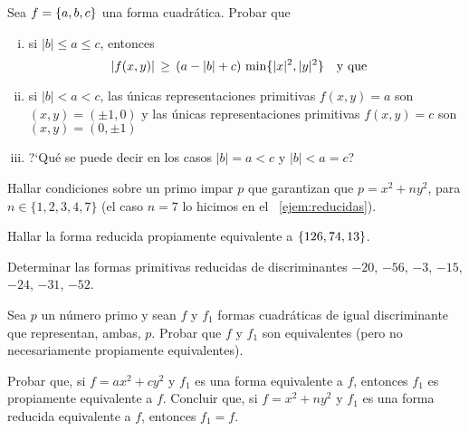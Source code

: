 \begin{ejerReducidas}\label{ejer:reducidas:cota}
	Sea $f=\left\{a,b,c\right\}$ una forma cuadr\'atica. Probar que
	\begin{enumerate}[(i)]
		\item\label{item:ejer:reducidas:cota:i}
			si $|b|\leq a\leq c$, entonces
			\begin{displaymath}
				|f(x,y)|\,\geq\,
					(a-|b|+c)\, \min\{|x|^2,|y|^2\}
				\quad\text{y que}\quad
			\end{displaymath}
		\item\label{item:ejer:reducidas:cota:ii}
			si $|b|<a<c$,
			las \'unicas representaciones primitivas
			$f(x,y)=a$ son $(x,y)=(\pm 1,0)$ y
			las \'unicas representaciones primitivas
			$f(x,y)=c$ son $(x,y)=(0,\pm 1)$
		\item\label{item:ejer:reducidas:cota:iii}
			?`Qu\'e se puede decir en los casos $|b|=a<c$ y
			$|b|<a=c$?
	\end{enumerate}
\end{ejerReducidas}

\begin{ejerReducidas}
	Hallar condiciones sobre un primo impar $p$ que garantizan
	que $p=x^2+ny^2$, para $n\in\{1,2,3,4,7\}$ (el caso
	$n=7$ lo hicimos en el \ejemname~\ref{ejem:reducidas}).
\end{ejerReducidas}

\begin{ejerReducidas}
	Hallar la forma reducida propiamente equivalente a
	$\left\{126,74,13\right\}$.
\end{ejerReducidas}

\begin{ejerReducidas}\label{ejer:reducidas:varios}
	Determinar las formas primitivas reducidas de discriminantes
	$-20$, $-56$, $-3$, $-15$, $-24$, $-31$, $-52$.
\end{ejerReducidas}

\begin{ejerReducidas}\label{ejer:reducidas:representaciones}
	Sea $p$ un n\'umero primo y sean $f$ y $f_1$ formas
	cuadr\'aticas de igual discriminante que representan,
	ambas, $p$. Probar que $f$ y $f_1$ son equivalentes
	(pero no necesariamente propiamente equivalentes).
\end{ejerReducidas}

\begin{ejerReducidas}\label{ejer:reducidas:representaciones:bis}
	Probar que, si $f=ax^2+cy^2$ y $f_1$ es una forma
	equivalente a $f$, entonces $f_1$ es propiamente
	equivalente a $f$. Concluir que, si $f=x^2+ny^2$ y
	$f_1$ es una forma reducida equivalente a $f$, entonces
	$f_1=f$.
\end{ejerReducidas}

